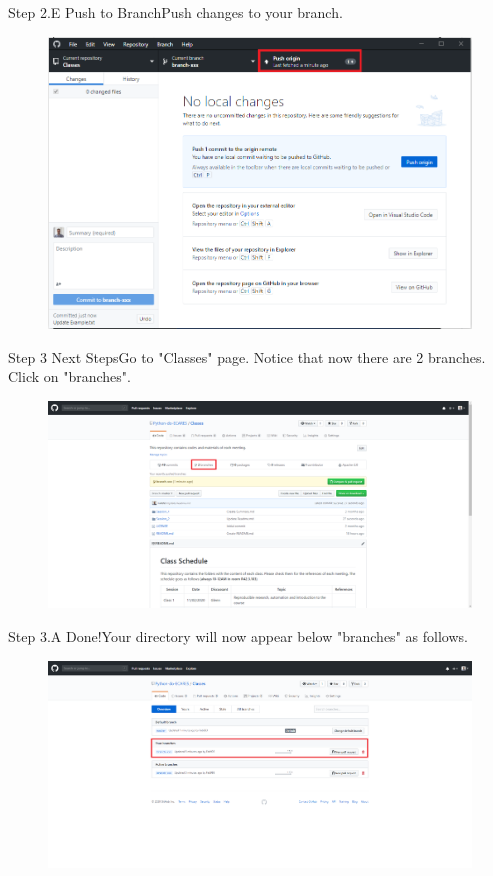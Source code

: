 \documentclass[aspectratio=169]{beamer}
\begin{document}
\begin{frame}{Step 2.E Push to Branch}{Push changes to your branch.}
	\begin{figure}
		\centering
		\includegraphics[width=0.7\linewidth]{../images/step2.G}
	\end{figure}
\end{frame}


\begin{frame}{Step 3 Next Steps}{Go to "Classes" page. Notice that now there are 2 branches. Click on "branches".}
	\begin{figure}
		\centering
		\includegraphics[width=0.9\linewidth]{../images/step3}
	\end{figure}
\end{frame}

\begin{frame}{Step 3.A Done!}{Your directory will now appear below "branches" as follows.}
	\begin{figure}
		\centering
		\includegraphics[width=1\linewidth]{../images/step3.A}
	\end{figure}
\end{frame}
\end{document}
